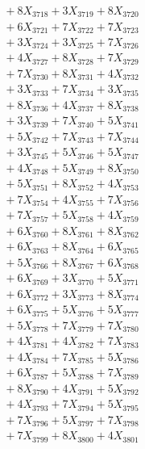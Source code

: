 \documentclass[a4paper,10pt]{article}
\begin{document}
{\begin{align}
&\;  + 8 X_{3718} + 3 X_{3719} + 8 X_{3720} \\[0.3ex]
&\;  + 6 X_{3721} + 7 X_{3722} + 7 X_{3723} \\[0.3ex]
&\;  + 3 X_{3724} + 3 X_{3725} + 7 X_{3726} \\[0.3ex]
&\;  + 4 X_{3727} + 8 X_{3728} + 7 X_{3729} \\[0.5ex]\allowbreak
&\;  + 7 X_{3730} + 8 X_{3731} + 4 X_{3732} \\[0.3ex]
&\;  + 3 X_{3733} + 7 X_{3734} + 3 X_{3735} \\[0.3ex]
&\;  + 8 X_{3736} + 4 X_{3737} + 8 X_{3738} \\[0.3ex]
&\;  + 3 X_{3739} + 7 X_{3740} + 5 X_{3741} \\[0.3ex]
&\;  + 5 X_{3742} + 7 X_{3743} + 7 X_{3744} \\[0.3ex]
&\;  + 3 X_{3745} + 5 X_{3746} + 5 X_{3747} \\[0.3ex]
&\;  + 4 X_{3748} + 5 X_{3749} + 8 X_{3750} \\[0.3ex]
&\;  + 5 X_{3751} + 8 X_{3752} + 4 X_{3753} \\[0.3ex]
&\;  + 7 X_{3754} + 4 X_{3755} + 7 X_{3756} \\[0.3ex]
&\;  + 7 X_{3757} + 5 X_{3758} + 4 X_{3759} \\[0.5ex]\allowbreak
&\;  + 6 X_{3760} + 8 X_{3761} + 8 X_{3762} \\[0.3ex]
&\;  + 6 X_{3763} + 8 X_{3764} + 6 X_{3765} \\[0.3ex]
&\;  + 5 X_{3766} + 8 X_{3767} + 6 X_{3768} \\[0.3ex]
&\;  + 6 X_{3769} + 3 X_{3770} + 5 X_{3771} \\[0.3ex]
&\;  + 6 X_{3772} + 3 X_{3773} + 8 X_{3774} \\[0.3ex]
&\;  + 6 X_{3775} + 5 X_{3776} + 5 X_{3777} \\[0.3ex]
&\;  + 5 X_{3778} + 7 X_{3779} + 7 X_{3780} \\[0.3ex]
&\;  + 4 X_{3781} + 4 X_{3782} + 7 X_{3783} \\[0.3ex]
&\;  + 4 X_{3784} + 7 X_{3785} + 5 X_{3786} \\[0.3ex]
&\;  + 6 X_{3787} + 5 X_{3788} + 7 X_{3789} \\[0.5ex]\allowbreak
&\;  + 8 X_{3790} + 4 X_{3791} + 5 X_{3792} \\[0.3ex]
&\;  + 4 X_{3793} + 7 X_{3794} + 5 X_{3795} \\[0.3ex]
&\;  + 7 X_{3796} + 5 X_{3797} + 7 X_{3798} \\[0.3ex]
&\;  + 7 X_{3799} + 8 X_{3800} + 4 X_{3801} \\[0.3ex]

\end{align}}
\end{document}
